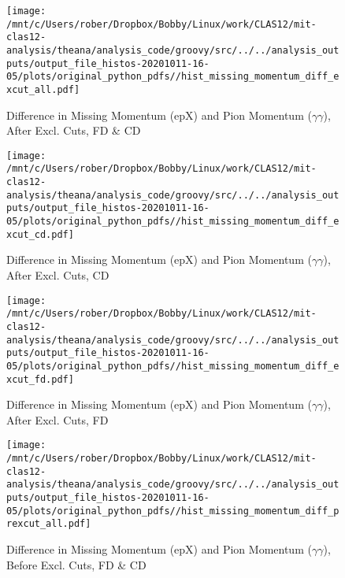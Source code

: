 \documentclass{article}
\begin{document}
\begin{landscape}
\begin{figure}[h]
        \texttt{[image: /mnt/c/Users/rober/Dropbox/Bobby/Linux/work/CLAS12/mit-clas12-analysis/theana/analysis\_code/groovy/src/../../analysis\_outputs/output\_file\_histos-20201011-16-05/plots/original\_python\_pdfs//hist\_missing\_momentum\_diff\_excut\_all.pdf]}
        \captionsetup{textformat=empty,labelformat=blank}
        \caption{Difference in Missing Momentum (epX) and Pion Momentum ($\gamma$$\gamma$), After Excl. Cuts, FD \& CD}
    \end{figure}
    \clearpage
    
    \begin{figure}[h]
        \centering

        \texttt{[image: /mnt/c/Users/rober/Dropbox/Bobby/Linux/work/CLAS12/mit-clas12-analysis/theana/analysis\_code/groovy/src/../../analysis\_outputs/output\_file\_histos-20201011-16-05/plots/original\_python\_pdfs//hist\_missing\_momentum\_diff\_excut\_cd.pdf]}
        \captionsetup{textformat=empty,labelformat=blank}
        \caption{Difference in Missing Momentum (epX) and Pion Momentum ($\gamma$$\gamma$), After Excl. Cuts, CD}
    \end{figure}
    \clearpage
    
    \begin{figure}[h]
        \centering

        \texttt{[image: /mnt/c/Users/rober/Dropbox/Bobby/Linux/work/CLAS12/mit-clas12-analysis/theana/analysis\_code/groovy/src/../../analysis\_outputs/output\_file\_histos-20201011-16-05/plots/original\_python\_pdfs//hist\_missing\_momentum\_diff\_excut\_fd.pdf]}
        \captionsetup{textformat=empty,labelformat=blank}
        \caption{Difference in Missing Momentum (epX) and Pion Momentum ($\gamma$$\gamma$), After Excl. Cuts, FD}
    \end{figure}
    \clearpage
    
    \begin{figure}[h]
        \centering

        \texttt{[image: /mnt/c/Users/rober/Dropbox/Bobby/Linux/work/CLAS12/mit-clas12-analysis/theana/analysis\_code/groovy/src/../../analysis\_outputs/output\_file\_histos-20201011-16-05/plots/original\_python\_pdfs//hist\_missing\_momentum\_diff\_prexcut\_all.pdf]}
        \captionsetup{textformat=empty,labelformat=blank}
        \caption{Difference in Missing Momentum (epX) and Pion Momentum ($\gamma$$\gamma$), Before Excl. Cuts, FD \& CD}
    \end{figure}
    \clearpage
    
    \begin{figure}[h]
        \centering


\end{figure}
\end{landscape}
\end{document}
